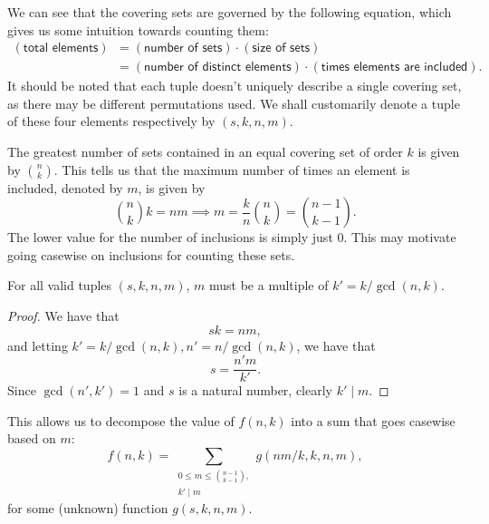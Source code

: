 \documentclass[a4paper, 12pt]{article}
\begin{document}
\begin{observation}
    We can see that the covering sets are governed by the following equation, which gives us some intuition towards counting them:
    \begin{align*}
        (\textsf{total elements}) &= (\textsf{number of sets}) \cdot (\textsf{size of sets}) \\
        &= (\textsf{number of distinct elements}) \cdot (\textsf{times elements are included})
    .\end{align*}
    It should be noted that each tuple doesn't uniquely describe a single covering set, as there may be different permutations used. We shall customarily denote a tuple of these four elements respectively by \( (s, k, n, m) \).

\end{observation}

\begin{observation}
    The greatest number of sets contained in an equal covering set of order \( k \) is given by \( \binom{n}{k}  \). This tells us that the maximum number of times an element is included, denoted by \( m \), is given by
    \[
        \binom{n}{k} k = n m \implies m = \frac{k}{n} \binom{n}{k} = \binom{n - 1}{k - 1} 
    .\]
    The lower value for the number of inclusions is simply just \( 0 \). This may motivate going casewise on inclusions for counting these sets.
\end{observation}

\begin{observation}
    For all valid tuples \( (s, k, n, m) \), \( m \) must be a multiple of \( k' = k / \gcd{(n, k)} \).

    \begin{proof}
        We have that
        \[
            sk = nm
        ,\]
        and letting \( k' = k / \gcd{(n, k)}, n' = n / \gcd{(n, k)} \), we have that
        \[
            s = \frac{n' m}{k'}
        .\]
        Since \( \gcd{(n', k')} = 1 \) and \( s \) is a natural number, clearly \( k' \mid m \).
    \end{proof}

    This allows us to decompose the value of \( f(n, k) \) into a sum that goes casewise based on \( m \):
    \[
        f(n, k) = \sum\limits_{\substack{0 \le m \le \binom{n - 1}{k - 1}, \\ k' \mid m}} g(nm / k, k, n, m)
    ,\]
    for some (unknown) function \( g(s, k, n, m) \).
\end{observation}
\end{document}
